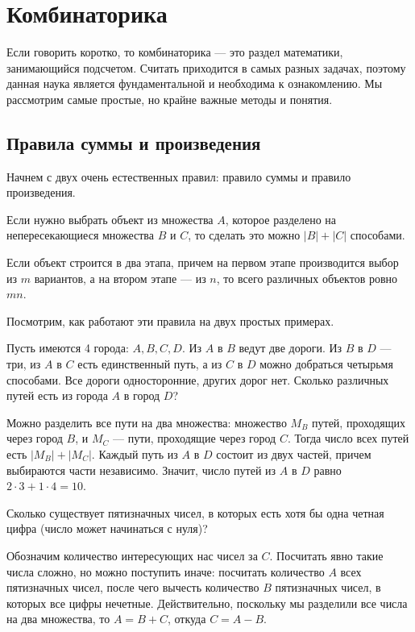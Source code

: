 \section{Комбинаторика}
Если говорить коротко, то комбинаторика --- это раздел математики,
занимающийся подсчетом. Считать приходится в самых разных задачах,
поэтому данная наука является фундаментальной и необходима к
ознакомлению. Мы рассмотрим самые простые, но крайне важные методы и
понятия.

\subsection{Правила суммы и произведения}

Начнем с двух очень естественных правил: правило суммы и правило
произведения.

\begin{statement}
    Если нужно выбрать объект из множества $A$, которое разделено
    на непересекающиеся множества $B$ и $C$, то сделать это можно
    $|B| + |C|$ способами.
\end{statement}

\begin{statement}
    Если объект строится в два этапа, причем на первом этапе
    производится выбор из $m$ вариантов, а на втором этапе --- из $n$, 
    то всего различных объектов ровно $mn$.
\end{statement}

Посмотрим, как работают эти правила на двух простых примерах.

\begin{task}
    Пусть имеются 4 города: $A, B, C, D$. Из $A$ в $B$ ведут две
    дороги. Из $B$ в $D$ --- три, из $A$ в $C$ есть единственный
    путь, а из $C$ в $D$ можно добраться четырьмя способами. Все
    дороги односторонние, других дорог нет. Сколько различных путей
    есть из города $A$ в город $D$?
\end{task}
Можно разделить все пути на два множества: множество $M_B$ путей,
проходящих через город $B$, и $M_C$ --- пути, проходящие через город
$C$. Тогда число всех путей есть $|M_B| + |M_C|$. Каждый путь из
$A$ в $D$ состоит из двух частей, причем выбираются части независимо.
Значит, число путей из $A$ в $D$ равно $2 \cdot 3 + 1 \cdot 4 = 10$.

\begin{task}
    Сколько существует пятизначных чисел, в которых есть хотя бы
    одна четная цифра (число может начинаться с нуля)?
\end{task}
Обозначим количество интересующих нас чисел за $C$. Посчитать явно
такие числа сложно, но можно поступить иначе: посчитать количество
$A$ всех пятизначных чисел, после чего вычесть количество $B$
пятизначных чисел, в которых все цифры нечетные. Действительно,
поскольку мы разделили все числа на два множества, то $A = B + C$,
откуда $C = A - B$.

